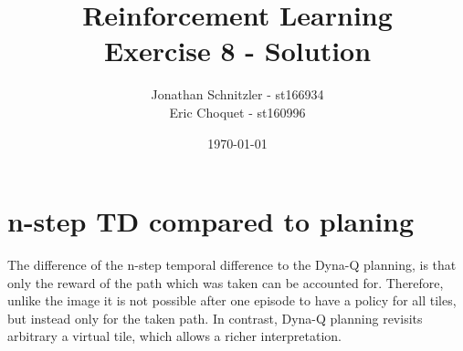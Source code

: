 \documentclass{article}
\title{Reinforcement Learning \\ Exercise 8 - Solution}
\author{Jonathan Schnitzler - st166934 \\
Eric Choquet - st160996}
\date{\today}
\begin{document}
\maketitle

\section{n-step TD compared to planing}

The difference of the n-step temporal difference to the Dyna-Q planning, is that only the reward of the path which was taken can be accounted for. Therefore, unlike the image it is not possible after one episode to have a policy for all tiles, but instead only for the taken path. In contrast, Dyna-Q planning revisits arbitrary a virtual tile, which allows a richer interpretation.
\end{document}
